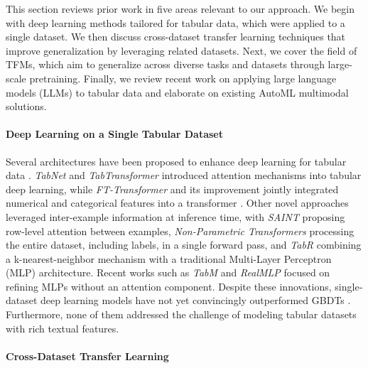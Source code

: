 \documentclass{article}
\begin{document}
This section reviews prior work in five areas relevant to our approach. We begin with deep learning methods tailored for tabular data, which were applied to a single dataset. We then discuss cross-dataset transfer learning techniques that improve generalization by leveraging related datasets. Next, we cover the field of TFMs, which aim to generalize across diverse tasks and datasets through large-scale pretraining. Finally, we review recent work on applying large language models (LLMs) to tabular data and elaborate on existing AutoML \cite{he_automl_2021} multimodal solutions.

\paragraph{Deep Learning on a Single Tabular Dataset}

Several architectures have been proposed to enhance deep learning for tabular data \cite{song_autoint_2019, katzir_net-dnf_2020, wang_dcn_2021, yang_locally_2022}. \textit{TabNet} \cite{arik_tabnet_2021} and \textit{TabTransformer} \cite{huang_tabtransformer_2020} introduced attention mechanisms into tabular deep learning, while \textit{FT-Transformer} \cite{gorishniy_revisiting_2021} and its improvement \cite{gorishniy_embeddings_2022} jointly integrated numerical and categorical features into a transformer \cite{vaswani_attention_2017}. Other novel approaches leveraged inter-example information at inference time, with \textit{SAINT} \cite{somepalli_saint_2021} proposing row-level attention between examples, \textit{Non-Parametric Transformers} \cite{kossen_self-attention_2021} processing the entire dataset, including labels, in a single forward pass, and \textit{TabR} \cite{gorishniy_tabr_2023} combining a k-nearest-neighbor mechanism with a traditional Multi-Layer Perceptron (MLP) architecture. Recent works such as \textit{TabM} \cite{gorishniy_tabm_2025} and \textit{RealMLP} \cite{holzmuller_better_2024} focused on refining MLPs without an attention component. Despite these innovations, single‐dataset deep learning models have not yet convincingly outperformed GBDTs \cite{shwartz-ziv_tabular_2022, grinsztajn_why_2022, shmuel_comprehensive_2024}. Furthermore, none of them addressed the challenge of modeling tabular datasets with rich textual features.

\paragraph{Cross-Dataset Transfer Learning} 
\end{document}
